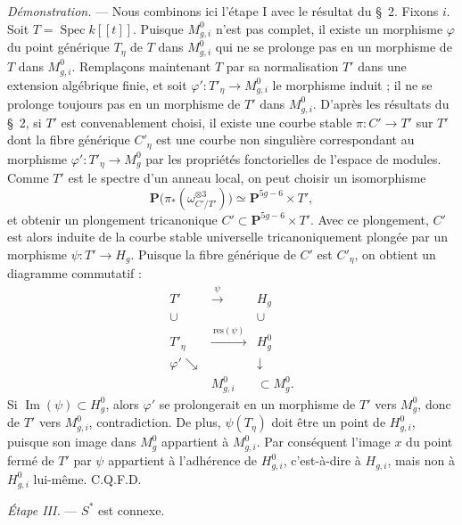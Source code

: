 \documentclass[10pt]{article}
\newcommand{\Spec}{\operatorname{Spec}}
\newcommand{\PP}{\mathbf P}
\begin{document}
\noindent\emph{Démonstration.} --- Nous combinons ici l'étape I avec le résultat du \S~2. Fixons $i$. Soit $T=\Spec k[[t]]$. Puisque $M^0_{g,i}$ n'est pas complet, il existe un morphisme $\varphi$ du point générique $T_\eta$ de $T$ dans $M^0_{g,i}$ qui ne se prolonge pas en un morphisme de $T$ dans $M^0_{g,i}$. Remplaçons maintenant $T$ par sa normalisation $T'$ dans une extension algébrique finie, et soit $\varphi':T'_\eta\to M^0_{g,i}$ le morphisme induit ; il ne se prolonge toujours pas en un morphisme de $T'$ dans $M^0_{g,i}$. D'après les résultats du \S~2, si $T'$ est convenablement choisi, il existe une courbe stable $\pi:C'\to T'$ sur $T'$ dont la fibre générique $C'_\eta$ est une courbe non singulière correspondant au morphisme $\varphi':T'_\eta\to M_g^0$ par les propriétés fonctorielles de l'espace de modules. Comme $T'$ est le spectre d'un anneau local, on peut choisir un isomorphisme
\[
\PP\bigl(\pi_*(\omega_{C'/T'}^{\otimes3})\bigr)\simeq\PP^{5g-6}\times T',
\]
et obtenir un plongement tricanonique $C'\subset\PP^{5g-6}\times T'$. Avec ce plongement, $C'$ est alors induite de la courbe stable universelle tricanoniquement plongée par un morphisme $\psi:T'\to H_g$. Puisque la fibre générique de $C'$ est $C'_\eta$, on obtient un diagramme commutatif :
\[
\begin{array}{ccc}
T'&\xrightarrow{\ \psi\ }&H_g\\
\cup&&\cup\\
T'_\eta&\xrightarrow{\ \mathrm{res}(\psi)\ }&H_g^0\\
\varphi'\searrow&&\downarrow\\
& M^0_{g,i}&\subset M_g^0.
\end{array}
\]
Si $\operatorname{Im}(\psi)\subset H_g^0$, alors $\varphi'$ se prolongerait en un morphisme de $T'$ vers $M_g^0$, donc de $T'$ vers $M^0_{g,i}$, contradiction. De plus, $\psi(T_\eta)$ doit être un point de $H^0_{g,i}$, puisque son image dans $M_g^0$ appartient à $M^0_{g,i}$. Par conséquent l'image $x$ du point fermé de $T'$ par $\psi$ appartient à l'adhérence de $H^0_{g,i}$, c'est-à-dire à $H_{g,i}$, mais non à $H^0_{g,i}$ lui-même. C.Q.F.D.

\medskip
\noindent\emph{Étape III.} --- $S^*$ est connexe.
\end{document}
